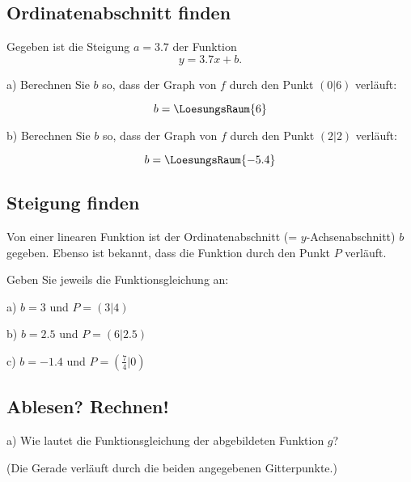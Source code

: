 \subsection{Ordinatenabschnitt finden}
Gegeben ist die Steigung $a=3.7$ der Funktion
$$y=3.7x + b.$$

a) Berechnen Sie $b$ so, dass der Graph von $f$ durch den Punkt $(0|6)$
verläuft:

$$b = \LoesungsRaum{6}$$



b) Berechnen Sie $b$ so, dass der Graph von $f$ durch den Punkt
$(2|2)$ verläuft:

$$b= \LoesungsRaum{-5.4}$$


\subsection{Steigung finden}

Von einer linearen Funktion ist der Ordinatenabschnitt (=
$y$-Achsenabschnitt) $b$ gegeben. Ebenso ist bekannt, dass die
Funktion durch den Punkt $P$ verläuft.

Geben Sie jeweils die Funktionsgleichung an:

a) $b=3$ und $P=(3|4)$


b) $b=2.5$ und $P=(6|2.5)$


c) $b=-1.4$ und $P=(\frac74|0)$

\subsection{Ablesen? Rechnen!}


a) Wie lautet die Funktionsgleichung der abgebildeten Funktion $g$?

(Die Gerade verläuft durch die beiden angegebenen Gitterpunkte.)



